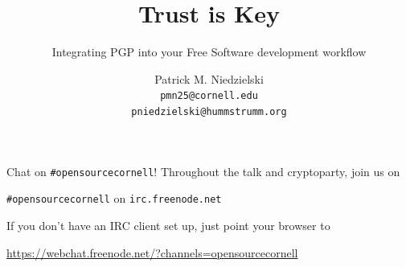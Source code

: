 \documentclass{beamer}
\title[Trust is Key\hspace{2em}\ccby]{Trust is Key}
\subtitle{Integrating PGP into your Free Software development workflow}
\author[Patrick M. Niedzielski]{Patrick
  M. Niedzielski\\\small\texttt{pmn25@cornell.edu}\\
  \texttt{pniedzielski@hummstrumm.org}}
\institute[]{Open Source Cornell}
\begin{document}
\begin{frame}{Chat on \texttt{\#opensourcecornell}!}
  Throughout the talk and cryptoparty, join us on

  \begin{center}
    \texttt{\#opensourcecornell} on \texttt{irc.freenode.net}
  \end{center}

  If you don't have an IRC client set up, just point your browser to

  \begin{center}
    \url{https://webchat.freenode.net/?channels=opensourcecornell}
  \end{center}
\end{frame}

\begin{frame}[plain]
  \titlepage
\end{frame}
\end{document}
